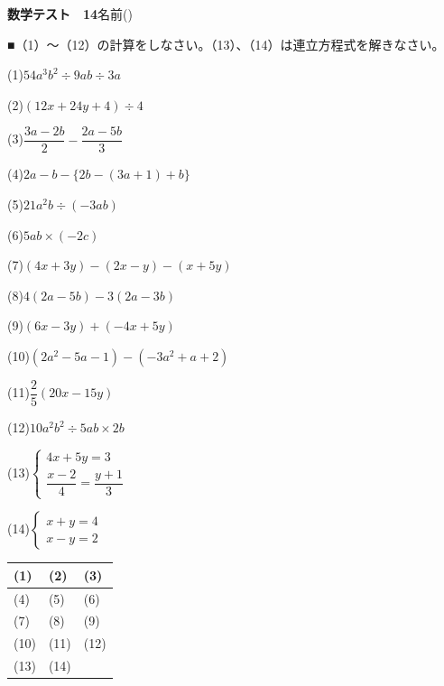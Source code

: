 \documentclass[a4paper,11pt]{ltjsarticle}
\newlength{\qcol}\setlength{\qcol}{0.47\textwidth}
\newlength{\qgap}
\newlength{\anscolw}\setlength{\anscolw}{0.30\textwidth}
\newlength{\ansh}
\newcommand{\Q}[2]{\parbox[t]{\qcol}{\raggedright (#1)\hspace{0.6em}$\displaystyle #2$}}
\newcommand{\QR}[4]{\Q{#1}{#2}\hfill\Q{#3}{#4}\par\vspace{\qgap}}
\newcommand{\anscell}[1]{\rule[-\ansdrop]{0pt}{\ansh}(#1)}
\newlength{\ansdrop}
\begin{document}
{\large\bfseries 数学テスト　14}\hfill 名前(\underline{\hspace{32mm}})\par\vspace{3mm}
■（1）〜（12）の計算をしなさい。（13）、（14）は連立方程式を解きなさい。\par\vspace{3mm}
\setlength{\qgap}{11mm}
\QR{1}{54a^3b^2\div9ab\div3a}{2}{(12x+24y+4)\div4}
\QR{3}{\dfrac{3a-2b}{2}-\dfrac{2a-5b}{3}}{4}{2a-b-\{2b-(3a+1)+b\}}
\QR{5}{21a^2b\div(-3ab)}{6}{5ab\times(-2c)}
\QR{7}{(4x+3y)-(2x-y)-(x+5y)}{8}{4(2a-5b)-3(2a-3b)}
\QR{9}{(6x-3y)+(-4x+5y)}{10}{(2a^2-5a-1)-(-3a^2+a+2)}
\QR{11}{\dfrac{2}{5}(20x-15y)}{12}{10a^2b^2\div5ab\times2b}
\QR{13}{\left\{\begin{array}{l} 4x+5y=3 \\ \dfrac{x-2}{4}=\dfrac{y+1}{3} \end{array}\right.}{14}{\left\{\begin{array}{l} x+y=4 \\ x-y=2 \end{array}\right.}
\vfill
\setlength{\ansh}{12mm}\setlength{\ansdrop}{8mm}%
\begin{center}\begin{tabular}{|p{\anscolw}|p{\anscolw}|p{\anscolw}|}\hline
\anscell{1} & \anscell{2} & \anscell{3} \\\hline
\anscell{4} & \anscell{5} & \anscell{6} \\\hline
\anscell{7} & \anscell{8} & \anscell{9} \\\hline
\anscell{10} & \anscell{11} & \anscell{12} \\\hline
\anscell{13} & \anscell{14} &  \\\hline
\end{tabular}\end{center}
\end{document}
